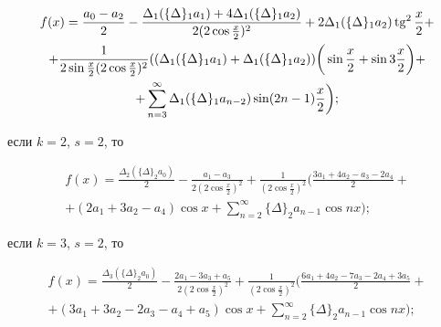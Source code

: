 \begin{lem}
\begin{multline*}
f(x)=\frac{a_0-a_2}{2}-


\frac{\Delta _1(\{\Delta \}_1 a_1)+4\Delta _1(\{\Delta \}_1


a_2)}{2(2\cos \frac{x}{2})^2}+


2\Delta _1(\{\Delta \}_1a_2)\tg^2\frac{x}{2}+\\


+\frac{1}{2\sin\frac{x}{2}(2\cos\frac{x}{2})^2}


((\Delta _1(\{\Delta\}_1 a_1)+\Delta _1(\{\Delta\}_1 


a_2))\bigg(\sin\frac x2+\sin 3\frac x2\bigg)+ \\ 


+\sum\limits_{n=3}^{\infty}\Delta _1(\{\Delta\}_1 


a_{n-2})\sin(2n-1)\frac{x}{2}\bigg);


\end{multline*}





если $k=2$, $s=2$, то


\begin{multline*}


f(x)=\frac{\Delta _2(\{\Delta\}_2a_0)}{2}-\frac{a_1-a_3}


{2(2\cos\frac{x}{2})^2}+


\frac{1}{(2\cos\frac{x}{2})^2}\bigg(


\frac{3a_1+4a_2-a_3-2a_4}{2} +\\


+(2a_1+3a_2-a_4)\cos x+


\sum\limits_{n=2}^{\infty}\{\Delta\}_2a_{n-1}\cos nx\bigg);


\end{multline*}





если $k=3$, $s=2$, то


\begin{multline*}


f(x)=\frac{\Delta _3(\{\Delta\}_2a_0)}{2}-\frac{2a_1-


3a_3+a_5}{2(2\cos\frac{x}{2})^2}+


\frac{1}{(2\cos\frac{x}{2})^2}\bigg(


\frac{6a_1+4a_2-7a_3-2a_4+3a_5}{2} + \\ +(3a_1+3a_2-2a_3-a_4+a_5)\cos x+


\sum\limits_{n=2}^{\infty}\{\Delta\}_2a_{n-1}\cos nx\bigg);


\end{multline*}






\end{lem}
